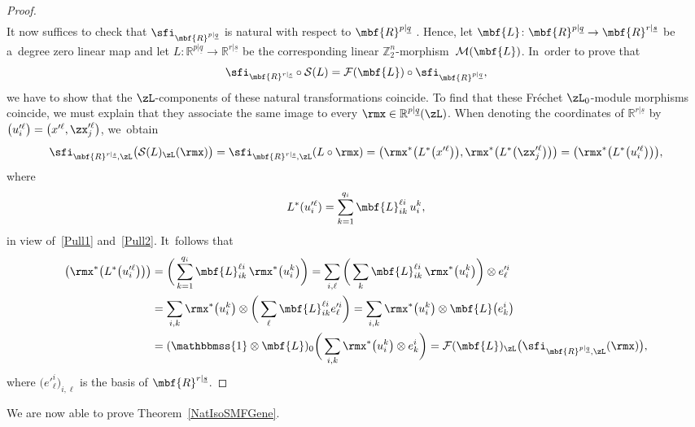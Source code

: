 \documentclass[pdftex]{sigma}%
\newcommand{\Id}{\mathbbmss{1}}
\newcommand{\R}{{\mathbb R}}
\newcommand{\Z}{{\mathbb Z}}
\def\ul{\underline}
\def\cM{\cal M}
\def\cF{\mathcal{F}}
\def\cM{\mathcal{M}}
\def\ul{\underline}
\newcommand{\0}{\otimes}
\newcommand{\z}{\Z_2^n}
\numberwithin{equation}{section}
\begin{document}
\begin{proof}
\begin{gather*}
\end{gather*}
It now suffices to check that $\sfi_{\mbf{R}^{p|\ul q}}$ is natural with respect to $\mbf{R}^{p|\ul q}$ . Hence, let $\mbf{L}\colon \mbf{R}^{p|\ul q}\to\mbf{R}^{r|\ul s}$ be a~degree zero linear map and let $L\colon \R^{p|\ul q}\to\R^{r|\ul s}$ be the corresponding linear $\z$-mor\-phism~$\cM(\mbf{L})$. In~order to prove that
\begin{gather}\label{NatI}
\sfi_{\mbf{R}^{r|\ul s}}\circ\mathcal{S}(L)=\cF(\mbf{L})\circ\sfi_{\mbf{R}^{p|\ul q}},
\end{gather}
we have to show that the $\zL$-components of these natural transformations coincide. To find that these Fr\'echet $\zL_0$-module morphisms coincide, we must explain that they associate the same image to every $\rmx\in\R^{p|\ul q}(\zL)$. When denoting the coordinates of $\R^{r|\ul s}$ by $\big(u'^\ell_i\big)=\big(x'^\ell,\zx'^\ell_j\big)$, we~obtain
\[
\sfi_{\mbf{R}^{r|\ul s},\zL}\big(\mathcal{S}(L)_\zL(\rmx)\big)=\sfi_{\mbf{R}^{r|\ul s},\zL}(L\circ\rmx)=\big(\rmx^*\big(L^*\big(x'^\ell\big)\big), \rmx^*\big(L^*\big(\zx'^{\ell}_j\big)\big)\big)=\big(\rmx^*\big(L^*\big(u'^\ell_i\big)\big)\big),
\]
where
\[
L^*(u'^{\ell}_i)=\sum_{k=1}^{q_i} \mbf{L}^{\ell i}_{i k}\,u^k_i,
\]
in view of~\eqref{Pull1} and~\eqref{Pull2}. It~follows that
\begin{align*}
\big(\rmx^*\big(L^*\big(u'^\ell_i\big)\big)\big)&=\bigg(\sum_{k=1}^{q_i} \mbf{L}^{\ell i}_{i k}\,\rmx^*\big(u^k_i\big)\bigg)=\sum_{i,\ell}\bigg(\sum_k\mbf{L}^{\ell i}_{ik}\,\rmx^*\big(u_i^k\big)\bigg)\0 e'^i_\ell
\\&
=\sum_{i,k}\rmx^*\big(u_i^k\big)\0 \bigg(\sum_\ell\mbf{L}^{\ell i}_{ik}e'^i_\ell\bigg)
=\sum_{i,k}\rmx^*\big(u_i^k\big)\0 \mbf{L}\big(e^i_k\big)
\\
&=(\Id\0\mbf{L})_0\bigg(\sum_{i,k}\rmx^*\big(u_i^k\big)\0 e^i_k\bigg)=\cF(\mbf{L})_\zL\big(\sfi_{\mbf{R}^{p|\ul q},\zL}(\rmx)\big),
\end{align*}
where $\big(e'^i_\ell\big)_{i,\ell}$ is the basis of $\mbf{R}^{r|\ul s}$.
\end{proof}

\newcommand{\cI}{\mathcal{I}}

We are now able to prove Theorem~\ref{NatIsoSMFGene}.
\end{document}
